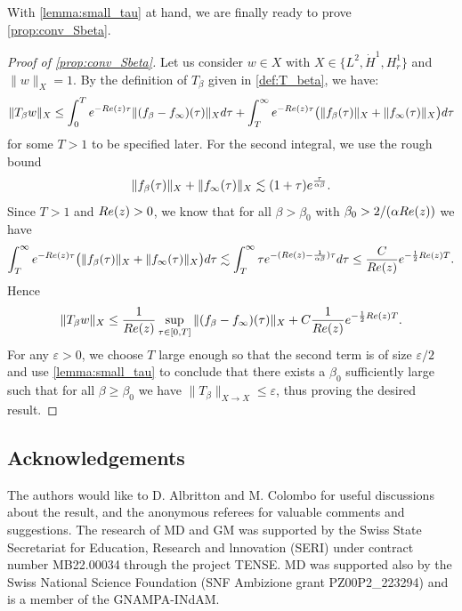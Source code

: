 \documentclass[11pt,reqno]{amsproc}
\def\dd{{\rm d}}
\def\eps{\varepsilon}
\def\e{{\rm e}}
\def\Re{{\rm Re}}
\theoremstyle{definition}
\theoremstyle{definition}
\numberwithin{equation}{section}
\begin{document}
With \cref{lemma:small_tau} at hand, we are finally ready to prove \cref{prop:conv_Sbeta}.
\begin{proof}[Proof of \cref{prop:conv_Sbeta}]
Let us consider $w \in X$ with $X\in \{L^2, \dot{H}^1,H^1_r\}$ and $\|w\|_X=1$. By the definition of $T_{\beta}$ given in \ref{def:T_beta}, we have:
\begin{equation}
\|T_{\beta} w\|_{X} \leq \int_0^T e^{-\Re(z)\tau} \| (f_\beta - f_\infty)(\tau)\|_{X} d\tau + \int_T^\infty e^{-\Re(z)\tau}  \big(\| f_\beta(\tau)\|_{X} +\|f_\infty(\tau)\|_{X}\big)d\tau
\end{equation}
for some $T>1$ to be specified later. For the second integral, we use the rough bound
\begin{equation}
    \| f_\beta(\tau)\|_{X} +\|f_\infty(\tau)\|_{X}\lesssim (1+\tau)\e^{\frac{\tau}{\alpha\beta}}.
\end{equation}
Since $T>1 $ and $\Re(z)>0$, we know that for all $\beta>\beta_0$ with $\beta_0>2/(\alpha\Re(z))$ we have
\begin{equation}
    \int_T^\infty e^{-\Re(z)\tau}  \big(\| f_\beta(\tau)\|_{X} +\|f_\infty(\tau)\|_{X}\big)d\tau\lesssim \int_T^{\infty}\tau \e^{-(\Re(z)-\frac{1}{\alpha\beta})\tau}\dd \tau\leq\frac{C}{\Re(z)}\e^{-\frac12\Re(z)T}.
\end{equation}
Hence
\begin{equation}
    \|T_{\beta} w\|_{X} \leq \frac{1}{\Re(z)}\sup_{\tau\in [0,T]}\|(f_\beta-f_\infty)(\tau)\|_X+C\frac{1}{\Re(z)}\e^{-\frac12\Re(z)T}.
\end{equation}
For any $\eps>0$, we choose $T$ large enough so that the second term is of size $\eps/2$ and use \cref{lemma:small_tau} to conclude that there exists a $\beta_0$ sufficiently large such that for all $\beta\geq \beta_0$ we have  $\|T_\beta\|_{X\to X}\leq \eps$, thus proving the desired result.
\end{proof}









\bigskip 

\subsection*{Acknowledgements} The authors would like to D. Albritton and M. Colombo for useful discussions about the result, and the anonymous referees for valuable comments and suggestions. The research of MD and GM was supported by the Swiss State Secretariat for Education, Research and lnnovation (SERI) under contract number MB22.00034 through the project TENSE. MD was supported also by the Swiss National Science Foundation (SNF Ambizione grant PZ00P2\_223294) and is a member of the GNAMPA-INdAM.





\end{document}
